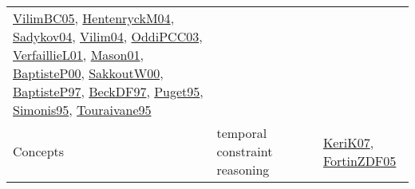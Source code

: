 {\begin{longtable}{llp{6cm}p{6cm}p{6cm}}
\href{articles/VilimBC05.pdf}{VilimBC05}\cite{VilimBC05}, \href{papers/HentenryckM04.pdf}{HentenryckM04}\cite{HentenryckM04}, \href{papers/Sadykov04.pdf}{Sadykov04}\cite{Sadykov04}, \href{papers/Vilim04.pdf}{Vilim04}\cite{Vilim04}, \href{papers/OddiPCC03.pdf}{OddiPCC03}\cite{OddiPCC03}, \href{papers/VerfaillieL01.pdf}{VerfaillieL01}\cite{VerfaillieL01}, \href{articles/Mason01.pdf}{Mason01}\cite{Mason01}, \href{articles/BaptisteP00.pdf}{BaptisteP00}\cite{BaptisteP00}, \href{articles/SakkoutW00.pdf}{SakkoutW00}\cite{SakkoutW00}, \href{papers/BaptisteP97.pdf}{BaptisteP97}\cite{BaptisteP97}, \href{papers/BeckDF97.pdf}{BeckDF97}\cite{BeckDF97}, \href{papers/Puget95.pdf}{Puget95}\cite{Puget95}, \href{papers/Simonis95.pdf}{Simonis95}\cite{Simonis95}, \href{papers/Touraivane95.pdf}{Touraivane95}\cite{Touraivane95}\\
Concepts & temporal constraint reasoning &  &  & \href{papers/KeriK07.pdf}{KeriK07}\cite{KeriK07}, \href{papers/FortinZDF05.pdf}{FortinZDF05}\cite{FortinZDF05}\\

\end{longtable}}
